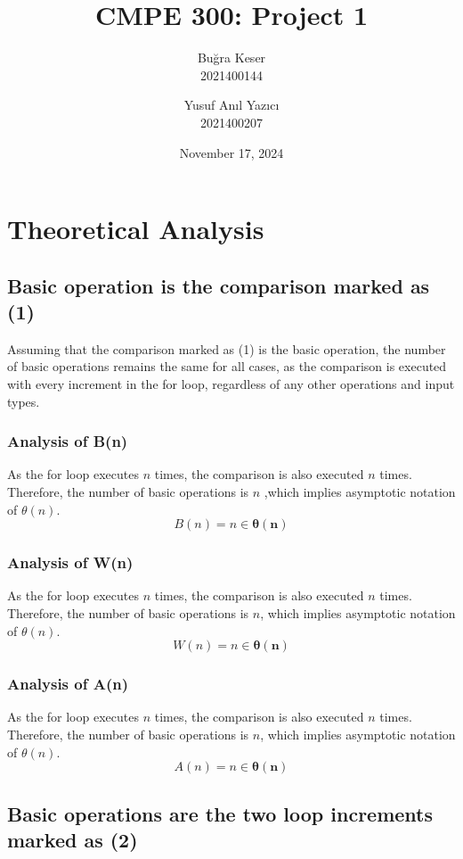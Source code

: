 \documentclass[11pt, oneside, a4paper]{article}
\title{CMPE 300: Project 1}
\author{
	Buğra Keser\\2021400144
	\and
	Yusuf Anıl Yazıcı\\2021400207
}
\date{November 17, 2024}
\begin{document}
	\maketitle

	\tableofcontents

	\newpage

	\section{Theoretical Analysis}


\subsection{Basic operation is the comparison marked as (1)}
Assuming that the comparison marked as (1) is the basic operation, the number of basic operations remains the same for all cases, as the comparison is executed with every increment in the for loop, regardless of any other operations and input types.

\subsubsection{Analysis of B(n)}
As the for loop executes \( n \) times, the comparison is also executed \( n \) times. Therefore, the number of basic operations is \( n \) ,which implies asymptotic notation of $\theta(n)$.
\[
B(n) = n \in \boldsymbol{\theta(n)}
\]

\subsubsection{Analysis of W(n)}
As the for loop executes \( n \) times, the comparison is also executed \( n \) times. Therefore, the number of basic operations is \( n \), which implies asymptotic notation of $\theta(n)$.
\[
W(n) = n \in \boldsymbol{\theta(n)}
\]

\subsubsection{Analysis of A(n)}
As the for loop executes \( n \) times, the comparison is also executed \( n \) times. Therefore, the number of basic operations is \( n \), which implies asymptotic notation of $\theta(n)$.
\[
A(n) = n \in \boldsymbol{\theta(n)}
\]


	\subsection{Basic operations are the two loop increments marked as (2)}
\end{document}

